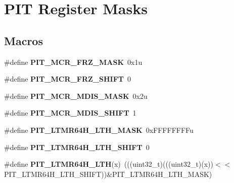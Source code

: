 \hypertarget{group___p_i_t___register___masks}{}\section{P\+IT Register Masks}
\label{group___p_i_t___register___masks}
\subsection*{Macros}
\begin{DoxyCompactItemize}
\item 
\mbox{\label{group___p_i_t___register___masks_ga8149a0bb21843632dd4528b540480ba7}} 
\#define {\bfseries P\+I\+T\+\_\+\+M\+C\+R\+\_\+\+F\+R\+Z\+\_\+\+M\+A\+SK}~0x1u
\item 
\mbox{\label{group___p_i_t___register___masks_ga500ccd29eaebc20aa853e7bbb23e3c0c}} 
\#define {\bfseries P\+I\+T\+\_\+\+M\+C\+R\+\_\+\+F\+R\+Z\+\_\+\+S\+H\+I\+FT}~0
\item 
\mbox{\label{group___p_i_t___register___masks_ga024258b2c23ff75f3e161e56adbbe733}} 
\#define {\bfseries P\+I\+T\+\_\+\+M\+C\+R\+\_\+\+M\+D\+I\+S\+\_\+\+M\+A\+SK}~0x2u
\item 
\mbox{\label{group___p_i_t___register___masks_ga7ddcd16550ff71e4ee5ac48022ae6fb6}} 
\#define {\bfseries P\+I\+T\+\_\+\+M\+C\+R\+\_\+\+M\+D\+I\+S\+\_\+\+S\+H\+I\+FT}~1
\item 
\mbox{\label{group___p_i_t___register___masks_ga2f52ce484f53348d406fae4b3cac7fdf}} 
\#define {\bfseries P\+I\+T\+\_\+\+L\+T\+M\+R64\+H\+\_\+\+L\+T\+H\+\_\+\+M\+A\+SK}~0x\+F\+F\+F\+F\+F\+F\+F\+Fu
\item 
\mbox{\label{group___p_i_t___register___masks_gaf355862db7eafd261031477364a6ef8d}} 
\#define {\bfseries P\+I\+T\+\_\+\+L\+T\+M\+R64\+H\+\_\+\+L\+T\+H\+\_\+\+S\+H\+I\+FT}~0
\item 
\mbox{\label{group___p_i_t___register___masks_gad3b13100c85d855043c5f19494f33c2d}} 
\#define {\bfseries P\+I\+T\+\_\+\+L\+T\+M\+R64\+H\+\_\+\+L\+TH}(x)~(((uint32\+\_\+t)(((uint32\+\_\+t)(x))$<$$<$P\+I\+T\+\_\+\+L\+T\+M\+R64\+H\+\_\+\+L\+T\+H\+\_\+\+S\+H\+I\+FT))\&P\+I\+T\+\_\+\+L\+T\+M\+R64\+H\+\_\+\+L\+T\+H\+\_\+\+M\+A\+SK)
$$
\end{DoxyCompactItemize}
